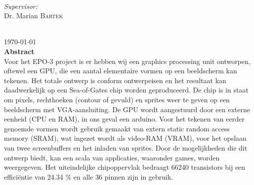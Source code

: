\documentclass[12pt]{scrreprt}
\begin{document}
\begin{titlepage}
\begin{minipage}{0.4\textwidth}
\begin{flushleft}
\end{flushleft}
\end{minipage}
~
\begin{minipage}{0.4\textwidth}
\begin{flushright} \large
\emph{Supervisor:} \\
Dr. Marian \textsc{Bartek} %
\end{flushright}
\end{minipage}\\[1.5cm]



{\large \today}\\ [1.5cm]


 
% 

\textbf{Abstract} \\
Voor het EPO-3 project is er hebben wij een graphics processing unit ontworpen, oftewel een GPU, die een aantal elementaire vormen op een beeldscherm kan tekenen. Het totale ontwerp is conform ontwerpeisen en het resultaat kan daadwerkelijk op een Sea-of-Gates chip worden geproduceerd. De chip is in staat om pixels, rechthoeken (contour of gevuld) en sprites weer te geven op een beeldscherm met VGA-aansluiting. De GPU wordt aangestuurd door een externe eenheid (CPU en RAM), in ons geval een arduino. Voor het tekenen van eerder genoemde vormen wordt gebruik gemaakt van extern static random access memory (SRAM), wat ingezet wordt als video-RAM (VRAM), voor het opslaan van twee screenbuffers en het inladen van sprites. Door de mogelijkheden die dit ontwerp biedt, kan een scala van applicaties, waaronder games, worden weergegeven. Het uiteindelijke chipoppervlak bedraagt 66240 transistors bij een efficiëntie van 24.34 \% en alle 36 pinnen zijn in gebruik.

\vfill %

\end{titlepage}
\end{document}
